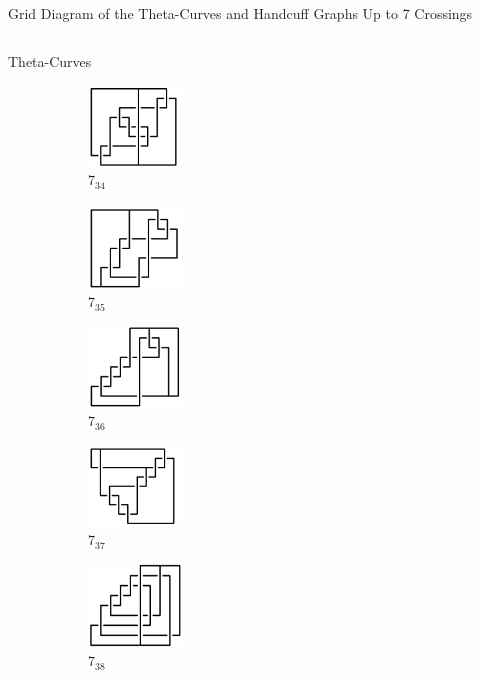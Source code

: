 \documentclass[final]{beamer}
\begin{document}
\begin{frame}[t]
\begin{alertblock}{Grid Diagram of the Theta-Curves and Handcuff Graphs Up to 7 Crossings}
\begin{columns}[t]
\begin{column}{0.7\textwidth}
\begin{alertblock}{Theta-Curves}
\begin{figure}
    \begin{subfigure}{0.075\textwidth}
    \includegraphics[width=2.5cm]{../Midterm_Poster/grid_diagram/theta_7_34.png}
    \caption{$7_{34}$} 
    \end{subfigure}
    \begin{subfigure}{0.075\textwidth}
    \includegraphics[width=2.5cm]{../Midterm_Poster/grid_diagram/theta_7_35.png}
    \caption{$7_{35}$} 
    \end{subfigure}
    \begin{subfigure}{0.075\textwidth}
    \includegraphics[width=2.5cm]{../Midterm_Poster/grid_diagram/theta_7_36.png}
    \caption{$7_{36}$} 
    \end{subfigure}
    \begin{subfigure}{0.075\textwidth}
    \includegraphics[width=2.5cm]{../Midterm_Poster/grid_diagram/theta_7_37.png}
    \caption{$7_{37}$} 
    \end{subfigure}
    \begin{subfigure}{0.075\textwidth}
    \includegraphics[width=2.5cm]{../Midterm_Poster/grid_diagram/theta_7_38.png}
    \caption{$7_{38}$} 
    \end{subfigure}
    \begin{subfigure}{0.075\textwidth}

\end{subfigure}
\end{figure}
\end{alertblock}
\end{column}
\end{columns}
\end{alertblock}
\end{frame}
\end{document}
